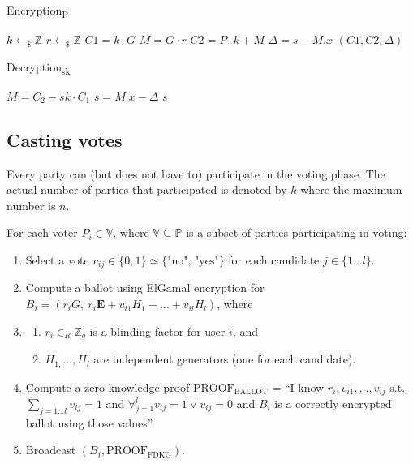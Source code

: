 \documentclass{article}
\begin{document}
\begin{algorithm}
    \caption{Encryption\textsubscript{P}}
    
    
    $k \gets_\$ \mathbb{Z}$\;
    $r \gets_\$ \mathbb{Z}$\;
    $C1 = k \cdot G$\;
    $M = G \cdot r$\;
    $C2 = P \cdot k + M$\;
    $\Delta = s - M.x$\;
    \Return $(C1, C2, \Delta)$\;
\end{algorithm}

\begin{algorithm}
    \caption{Decryption\textsubscript{sk}}
    
    
    $M = C_2 - sk \cdot C_1$\;
    $s = M.x - \Delta$\;
    \Return $s$\;
\end{algorithm}



\subsection{Casting votes}

Every party can (but does not have to) participate in the voting phase. The actual number of parties that participated is denoted by $k$ where the maximum number is $n$.

For each voter $P_i \in \mathbb{V}$, where $\mathbb{V} \subseteq  \mathbb{P}$ is a subset of parties participating in voting:

\begin{enumerate}
    \item Select a vote $v_{ij} \in \{0,1\} \simeq \{\textrm{"no", "yes"}\}$ for each candidate $j \in \{1 \dots l\}$.
    \item Compute a ballot using ElGamal encryption for $B_i = (r_i G,\ r_i \mathbf{E} + v_{i1} H_1 + \dots + v_{il} H_l)$, where 
    \item \begin{enumerate}
        \item $r_{i} \in_{R} \mathbb{Z}_q$ is a blinding factor for user $i$, and 
        \item $H_{1,}\dots, H_{l}$ are independent generators (one for each candidate).
    \end{enumerate}
    \item Compute a zero-knowledge proof $\textrm{PROOF}_\textrm{BALLOT}$ = “I know $r_i, v_{i1},\dots,v_{ij}$ s.t.$\sum_{j= 1 \dots l}v_{ij}=1$ and $\forall_{j=1}^{l}v_{ij}=1 \lor v_{ij}=0$ and $B_i$ is a correctly encrypted ballot using those values”
    \item Broadcast $(B_i,\textrm{PROOF}_\textrm{FDKG})$.
\end{enumerate}
\end{document}
